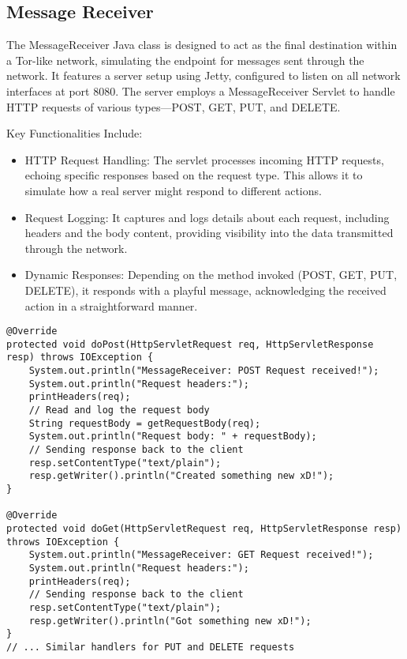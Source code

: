 \documentclass[sigconf]{acmart}
\begin{document}
\subsection{Message Receiver}
The MessageReceiver Java class is designed to act as the final destination within a Tor-like network, simulating the endpoint for messages sent through the network. It features a server setup using Jetty, configured to listen on all network interfaces at port 8080. The server employs a MessageReceiver Servlet to handle HTTP requests of various types—POST, GET, PUT, and DELETE.

Key Functionalities Include:
\begin{itemize}
    \item HTTP Request Handling: The servlet processes incoming HTTP requests, echoing specific responses based on the request type. This allows it to simulate how a real server might respond to different actions.
    \item Request Logging: It captures and logs details about each request, including headers and the body content, providing visibility into the data transmitted through the network.
    \item Dynamic Responses: Depending on the method invoked (POST, GET, PUT, DELETE), it responds with a playful message, acknowledging the received action in a straightforward manner.
\end{itemize}
\begin{lstlisting}[caption=Final Destination Server]
@Override
protected void doPost(HttpServletRequest req, HttpServletResponse resp) throws IOException {
    System.out.println("MessageReceiver: POST Request received!");
    System.out.println("Request headers:");
    printHeaders(req);
    // Read and log the request body
    String requestBody = getRequestBody(req);
    System.out.println("Request body: " + requestBody);
    // Sending response back to the client
    resp.setContentType("text/plain");
    resp.getWriter().println("Created something new xD!");
}

@Override
protected void doGet(HttpServletRequest req, HttpServletResponse resp) throws IOException {
    System.out.println("MessageReceiver: GET Request received!");
    System.out.println("Request headers:");
    printHeaders(req);
    // Sending response back to the client
    resp.setContentType("text/plain");
    resp.getWriter().println("Got something new xD!");
}
// ... Similar handlers for PUT and DELETE requests
\end{lstlisting}
\end{document}
